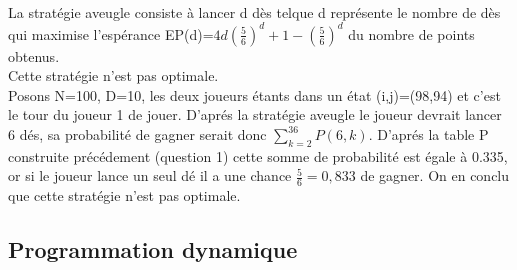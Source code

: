 \documentclass{article}
\begin{document}
\paragraph{}
    \begin{large}
    La stratégie aveugle consiste à lancer d dès telque d représente le nombre de dès qui maximise l'espérance EP(d)=$4d(\frac{5}{6})^{d}+1-(\frac{5}{6})^{d}$ du nombre de points obtenus.\\
    
    Cette stratégie n'est pas optimale.\\
    Posons N=100, D=10, les deux joueurs étants dans un état (i,j)=(98,94) et c'est le tour du joueur 1 de jouer. D'aprés la stratégie aveugle le joueur devrait lancer 6 dés, sa probabilité de gagner serait donc $\sum_{k=2}^{36}P(6,k)$. D'aprés la table P construite précédement (question 1) cette somme de probabilité est égale à 0.335, or si le joueur lance un seul dé il a une chance $\frac{5}{6}=0,833$ de gagner. On en conclu que cette stratégie n'est pas optimale.
    \end{large}


    \subsection{Programmation dynamique}
\end{document}
